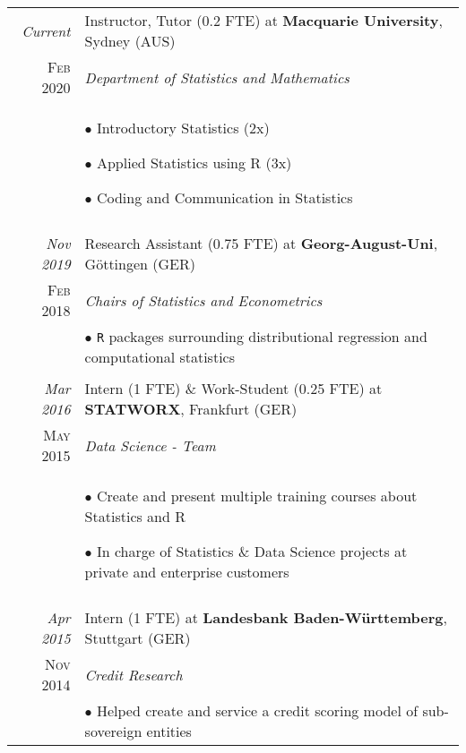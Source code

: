 \documentclass[a4paper,10pt]{article} %
\begin{document}
\begin{longtable}{r|p{10cm}}


  \emph{Current} & Instructor, Tutor (0.2 FTE) at \textbf{Macquarie University}, Sydney (AUS) \\
  \textsc{Feb 2020} & \emph{Department of Statistics and Mathematics}\\
  & \footnotesize{$\bullet$ Introductory Statistics (2x)


  $\bullet$ Applied Statistics using R (3x)
  

$\bullet$ Coding and Communication in Statistics} \\
  \multicolumn{2}{c}{} \\


  \emph{Nov 2019} & Research Assistant (0.75 FTE) at \textbf{Georg-August-Uni}, Göttingen (GER)\\
  \textsc{Feb 2018} & \emph{Chairs of Statistics and Econometrics}\\
  & \footnotesize{
  $\bullet$ \texttt{R} packages surrounding distributional regression and computational statistics}\\
  \multicolumn{2}{c}{} \\


\emph{Mar 2016} & Intern (1 FTE) \& Work-Student (0.25 FTE) at \textbf{STATWORX}, Frankfurt (GER)\\
\textsc{May 2015} & \emph{Data Science - Team} \\
& \footnotesize{$\bullet$ Create and present multiple training courses about Statistics and R

$\bullet$ In charge of Statistics \& Data Science projects at private and enterprise customers}\\
\multicolumn{2}{c}{} \\


\newpage

\emph{Apr 2015} & Intern (1 FTE) at \textbf{Landesbank Baden-Württemberg}, Stuttgart (GER)\\
\textsc{Nov 2014} & \emph{Credit Research} \\
& \footnotesize{$\bullet$ Helped create and service a credit scoring model of sub-sovereign entities

}
\end{longtable}
\end{document}
